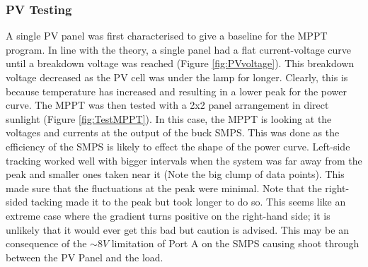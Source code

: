 \documentclass[10pt,twoside]{article}
\begin{document}
\subsubsection{PV Testing}

A single PV panel was first characterised to give a baseline for the MPPT program. In line with the theory, a single panel had a flat current-voltage curve until a breakdown voltage was reached (Figure \ref{fig:PVvoltage}). This breakdown voltage decreased as the PV cell was under the lamp for longer. Clearly, this is because temperature has increased and resulting in a lower peak for the power curve. The MPPT was then tested with a 2x2 panel arrangement in direct sunlight (Figure \ref{fig:TestMPPT}). In this case, the MPPT is looking at the voltages and currents at the output of the buck SMPS. This was done as the efficiency of the SMPS is likely to effect the shape of the power curve. Left-side tracking worked well with bigger intervals when the system was far away from the peak and smaller ones taken near it (Note the big clump of data points). This made sure that the fluctuations at the peak were minimal. Note that the right-sided tacking made it to the peak but took longer to do so. This seems like an extreme case where the gradient turns positive on the right-hand side; it is unlikely that it would ever get this bad but caution is advised. This may be an consequence of the $\sim 8V$ limitation of Port A on the SMPS causing shoot through between the PV Panel and the load. 
\end{document}
